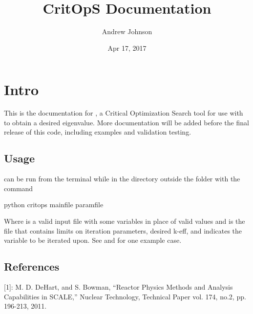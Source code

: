 \documentclass[letterpaper,10pt,english]{sphinxmanual}
\title{CritOpS Documentation}
\date{Apr 17, 2017}
\author{Andrew Johnson}
\begin{document}
\maketitle
\sphinxtableofcontents
{}\label{\detokenize{index::doc}}



\chapter{Intro}
\label{\detokenize{intro:intro}}\label{\detokenize{intro::doc}}\label{\detokenize{intro:welcome-to-critops-s-documentation}}
This is the documentation for , a Critical Optimization Search tool for use with  to obtain a desired eigenvalue.
More documentation will be added before the final release of this code, including examples and validation testing.


\section{Usage}
\label{\detokenize{intro:usage}}
 can be run from the terminal while in the directory outside the  folder with the command

\begin{sphinxVerbatim}[commandchars=\\\{\}]
\PYGZdl{} python critops \PYGZlt{}mainfile\PYGZgt{} \PYGZlt{}paramfile\PYGZgt{}
\end{sphinxVerbatim}

Where  is a valid  input file with some variables in place of valid values and  is the
file that contains limits on iteration parameters, desired k-eff, and indicates the variable to be iterated upon.
See  and  for one example case.


\section{References}
\label{\detokenize{intro:references}}
{[}1{]}: M. D. DeHart, and S. Bowman, ``Reactor Physics Methods and Analysis Capabilities in SCALE,'' Nuclear Technology, Technical Paper vol. 174, no.2, pp. 196-213, 2011.
\end{document}
